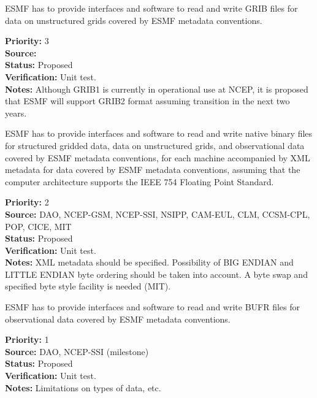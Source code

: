 
ESMF has to provide interfaces and software to read and write GRIB
files for data on unstructured grids covered by ESMF metadata conventions.

\begin{reqlist}
{\bf Priority:} 3 \\
{\bf Source:} \\
{\bf Status:} Proposed \\
{\bf Verification:} Unit test. \\
{\bf Notes:} Although GRIB1 is currently in operational use at NCEP,
it is proposed that ESMF will support GRIB2 format assuming transition
in the next two years.
\end{reqlist}



ESMF has to provide interfaces and software to read and write native
binary files for structured gridded data, data on unstructured grids, and 
observational data  covered by ESMF metadata conventions, for each machine 
accompanied by XML metadata for data covered by ESMF metadata conventions,
assuming that the computer architecture supports the IEEE 754 Floating
Point Standard. 

\begin{reqlist}
{\bf Priority:} 2 \\
{\bf Source:} DAO, NCEP-GSM, NCEP-SSI, NSIPP, CAM-EUL, CLM, CCSM-CPL, POP, CICE, MIT \\
{\bf Status:} Proposed \\
{\bf Verification:} Unit test. \\
{\bf Notes:} XML metadata should be specified. Possibility of BIG
ENDIAN and LITTLE ENDIAN byte ordering should be taken into account.
A byte swap and specified byte style facility is needed (MIT).
\end{reqlist}



ESMF has to provide interfaces and software to read and write BUFR files for
observational data covered by ESMF metadata conventions.

\begin{reqlist}
{\bf Priority:} 1 \\
{\bf Source:} DAO, NCEP-SSI (milestone) \\
{\bf Status:} Proposed \\
{\bf Verification:} Unit test. \\
{\bf Notes:} Limitations on types of data, etc.
\end{reqlist}


